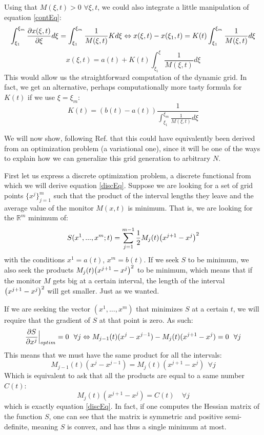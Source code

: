 \documentclass[11pt, a4paper]{article} %
\newcommand{\R}{\mathbb{R}} %
\begin{document}
Using that $M(\xi,t)>0$ $\forall \xi,t$, we could also integrate a little manipulation of equation \eqref{contEq}:
\begin{equation}
\int^{\xi_m}_{\xi_1}  \pdv{x(\xi,t)}{\xi} d\xi=\int^{\xi_m}_{\xi_1} \frac{1}{M(\xi,t)} K d \xi  \Leftrightarrow x(\xi,t)-x(\xi_1,t) =K(t)\int^{\xi_m}_{\xi_1} \frac{1}{M(\xi,t)}  d \xi
\end{equation}
\begin{equation}
x(\xi,t)=a(t)+K(t)\int^\xi_{\xi_1} \frac{1}{M(\xi,t)}d\xi
\end{equation}
This would allow us the straightforward computation of the dynamic grid. In fact, we get an alternative, perhaps computationally more tasty formula for $K(t)$ if we use $\xi=\xi_m$:
\begin{equation}
K(t)=(b(t)-a(t))\frac{1}{\int^{\xi_m}_{\xi_1} \frac{1}{M(\xi,t)}d\xi}
\end{equation}

We will now show, following Ref.\cite{movingGrids} that this could have equivalently been derived from an optimization problem (a variational one), since it will be one of the ways to explain how we can generalize this grid generation to arbitrary $N$.

First let us express a discrete optimization problem, a discrete functional from which we will derive equation \eqref{discEq}. Suppose we are looking for a set of grid points $\{x^j \}_{j=1}^m$ such that the product of the interval lengths they leave and the average value of the monitor $M(x,t)$ is minimum. That is, we are looking for the $\R^m$ minimum of: 
\begin{equation}\label{discFunc}
S( x^1,...,x^m;t)=\sum_{j=1}^{m-1} \frac{1}{2} M_j(t) \qty(x^{j+1}-x^j)^2
\end{equation}
with the conditions $x^1=a(t)$, $x^m=b(t)$. If we seek $S$ to be minimum, we also seek the products $M_j(t) \qty(x^{j+1}-x^j)^2$ to be minimum, which means that if the monitor $M$ gets big at a certain interval, the length of the interval $\qty(x^{j+1}-x^j)^2$ will get smaller. Just as we wanted.

If we are seeking the vector $(x^1,...,x^m)$ that minimizes $S$ at a certain $t$, we will require that the gradient of $S$ at that point is zero. As such:
\begin{equation}
\pdv{S}{x^j}\Big\rvert_{optim}=0\ \ \forall j\Leftrightarrow M_{j-1}(t)(x^j-x^{j-1})-M_j(t)(x^{j+1}-x^j)=0\ \ \forall j
\end{equation}
This means that we must have the same product for all the intervals:
\begin{equation}
 M_{j-1}(t)(x^j-x^{j-1})=M_j(t)(x^{j+1}-x^j)\ \ \forall j
\end{equation}
Which is equivalent to ask that all the products are equal to a same number $C(t)$:
\begin{equation}
M_j(t)(x^{j+1}-x^j)=C(t) \quad \forall j
\end{equation}
which is exactly equation \eqref{discEq}. In fact, if one computes the Hessian matrix of the function $S$, one can see that the matrix is symmetric and positive semi-definite, meaning $S$ is convex, and has thus a single minimum at most. 
\end{document}

